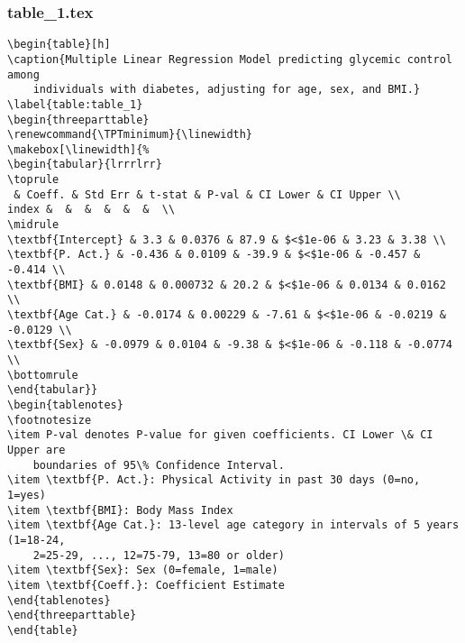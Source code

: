 \documentclass[11pt]{article}
\begin{document}
\subsubsection*{table\_1.tex}

\begin{Verbatim}[tabsize=4]
\begin{table}[h]
\caption{Multiple Linear Regression Model predicting glycemic control among
	individuals with diabetes, adjusting for age, sex, and BMI.}
\label{table:table_1}
\begin{threeparttable}
\renewcommand{\TPTminimum}{\linewidth}
\makebox[\linewidth]{%
\begin{tabular}{lrrrlrr}
\toprule
 & Coeff. & Std Err & t-stat & P-val & CI Lower & CI Upper \\
index &  &  &  &  &  &  \\
\midrule
\textbf{Intercept} & 3.3 & 0.0376 & 87.9 & $<$1e-06 & 3.23 & 3.38 \\
\textbf{P. Act.} & -0.436 & 0.0109 & -39.9 & $<$1e-06 & -0.457 & -0.414 \\
\textbf{BMI} & 0.0148 & 0.000732 & 20.2 & $<$1e-06 & 0.0134 & 0.0162 \\
\textbf{Age Cat.} & -0.0174 & 0.00229 & -7.61 & $<$1e-06 & -0.0219 & -0.0129 \\
\textbf{Sex} & -0.0979 & 0.0104 & -9.38 & $<$1e-06 & -0.118 & -0.0774 \\
\bottomrule
\end{tabular}}
\begin{tablenotes}
\footnotesize
\item P-val denotes P-value for given coefficients. CI Lower \& CI Upper are
	boundaries of 95\% Confidence Interval.
\item \textbf{P. Act.}: Physical Activity in past 30 days (0=no, 1=yes)
\item \textbf{BMI}: Body Mass Index
\item \textbf{Age Cat.}: 13-level age category in intervals of 5 years (1=18-24,
	2=25-29, ..., 12=75-79, 13=80 or older)
\item \textbf{Sex}: Sex (0=female, 1=male)
\item \textbf{Coeff.}: Coefficient Estimate
\end{tablenotes}
\end{threeparttable}
\end{table}

\end{Verbatim}




\end{document}

